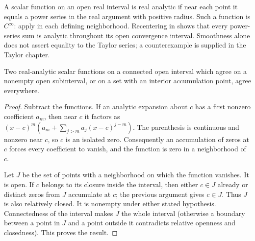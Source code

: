 \begin{definition}
A scalar function on an open real interval is real analytic if near each point it equals a power series in the real argument with positive radius. Such a function is $C^\infty$: apply  in each defining neighborhood. Recentering in  shows that every power-series sum is analytic throughout its open convergence interval. Smoothness alone does not assert equality to the Taylor series; a counterexample is supplied in the Taylor chapter.
\end{definition}

\begin{theorem}
Two real-analytic scalar functions on a connected open interval which agree on a nonempty open subinterval, or on a set with an interior accumulation point, agree everywhere.
\end{theorem}
\begin{proof}
Subtract the functions. If an analytic expansion about $c$ has a first nonzero coefficient $a_m$, then near $c$ it factors as $(x-c)^m(a_m+\sum_{j>m}a_j(x-c)^{j-m})$. The parenthesis is continuous and nonzero near $c$, so $c$ is an isolated zero. Consequently an accumulation of zeros at $c$ forces every coefficient to vanish, and the function is zero in a neighborhood of $c$.

Let $J$ be the set of points with a neighborhood on which the function vanishes. It is open. If $c$ belongs to its closure inside the interval, then either $c\in J$ already or distinct zeros from $J$ accumulate at $c$; the previous argument gives $c\in J$. Thus $J$ is also relatively closed. It is nonempty under either stated hypothesis. Connectedness of the interval makes $J$ the whole interval (otherwise a boundary between a point in $J$ and a point outside it contradicts relative openness and closedness). This proves the result.
\end{proof}

